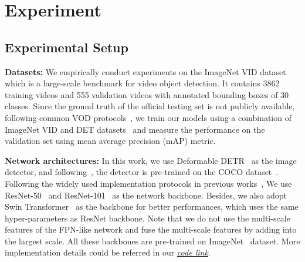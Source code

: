 \documentclass[10pt,journal,compsoc]{IEEEtran}
\begin{document}
\section{Experiment}


\subsection{Experimental Setup}
\noindent 
\textbf{Datasets:} We empirically conduct experiments on the ImageNet VID dataset~\cite{russakovsky2015imagenet} which is a large-scale benchmark for video object detection. It contains 3862 training videos and 555 validation videos
with annotated bounding boxes of 30 classes. Since the ground truth of the official
testing set is not publicly available, following common VOD protocols~\cite{zhu17fgfa, wang18manet, deng19rdn, wu19selsa}, we train our models using a combination of ImageNet VID and DET datasets~\cite{russakovsky2015imagenet} and measure the performance on the validation set using mean average precision (mAP) metric. 


\noindent
\textbf{Network architectures:} In this work, we use Deformable DETR~\cite{zhu2020deformable} as the image detector, and following~\cite{yao2020video,liu2019looking,qian2020adaptive}, the detector is pre-trained on the COCO dataset~\cite{COCO_dataset}. 
Following the
widely used implementation protocols in previous works~\cite{zhu17fgfa, wang18manet, deng19rdn, wu19selsa}, We use ResNet-50~\cite{he16res} and ResNet-101~\cite{he16res} as the network backbone. Besides, we also adopt Swin Transformer~\cite{liu2021swin} as the backbone 
for better performances, which uses the same hyper-parameters as ResNet backbone. Note that we do not use the  multi-scale features of the FPN-like network and fuse the multi-scale features by adding into the largest scale.
All these backbones are pre-trained on ImageNet~\cite{deng2009imagenet} dataset.
More implementation details could be referred in our \href{https://github.com/SJTU-LuHe/TransVOD}{\textit{code link}}.
\end{document}
